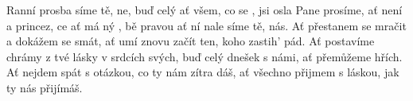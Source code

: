 \begin{TEXT}{Ranní prosba}
\SLOKA {}síme tě, ne, buď  celý  \NL
ať  všem, co se , jsi  osla 
\REFREN  Pane  prosíme,  \NL
ať  není  a  princez,\NL
{}ce ať má ný , \NL
{}bě pravou  ať ní nale \NL
{}síme tě,  nás.
\SLOKA Ať přestanem se mračit a dokážem se smát,\NL
ať umí znovu začít ten, koho zastih' pád.
\SLOKA Ať postavíme chrámy z tvé lásky v srdcích svých,\NL
buď celý dnešek s námi, ať přemůžeme hřích.
\SLOKA Ať nejdem spát s otázkou, co ty nám zítra dáš,\NL
ať všechno přijmem s láskou, jak ty nás přijímáš. \NL
\end{TEXT}

